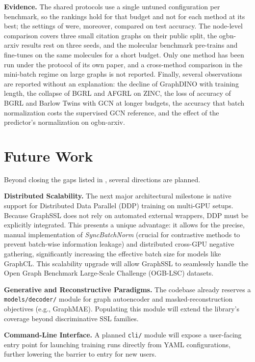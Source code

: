 \documentclass[conference]{IEEEtran}
\begin{document}
\textbf{Evidence.} The shared protocols use a single untuned configuration per benchmark, so the rankings hold for that budget and not for each method at its best; the settings of  were, moreover, compared on test accuracy. The node-level comparison covers three small citation graphs on their public split, the ogbn-arxiv results rest on three seeds, and the molecular benchmark pre-trains and fine-tunes on the same molecules for a short budget. Only one method has been run under the protocol of its own paper, and a cross-method comparison in the mini-batch regime on large graphs is not reported. Finally, several observations are reported without an explanation: the decline of GraphDINO with training length, the collapse of BGRL and AFGRL on ZINC, the loss of accuracy of BGRL and Barlow Twins with GCN at longer budgets, the accuracy that batch normalization costs the supervised GCN reference, and the effect of the predictor's normalization on ogbn-arxiv.

\section{Future Work}
Beyond closing the gaps listed in , several directions are planned.

\textbf{Distributed Scalability.} The next major architectural milestone is native support for Distributed Data Parallel (DDP) training on multi-GPU setups. Because GraphSSL does not rely on automated external wrappers, DDP must be explicitly integrated. This presents a unique advantage: it allows for the precise, manual implementation of \textit{SyncBatchNorm} (crucial for contrastive methods to prevent batch-wise information leakage) and distributed cross-GPU negative gathering, significantly increasing the effective batch size for models like GraphCL. This scalability upgrade will allow GraphSSL to seamlessly handle the Open Graph Benchmark Large-Scale Challenge (OGB-LSC) datasets.

\textbf{Generative and Reconstructive Paradigms.} The codebase already reserves a \texttt{models/decoder/} module for graph autoencoder and masked-reconstruction objectives (e.g., GraphMAE). Populating this module will extend the library's coverage beyond discriminative SSL families.

\textbf{Command-Line Interface.} A planned \texttt{cli/} module will expose a user-facing entry point for launching training runs directly from YAML configurations, further lowering the barrier to entry for new users.
\end{document}
